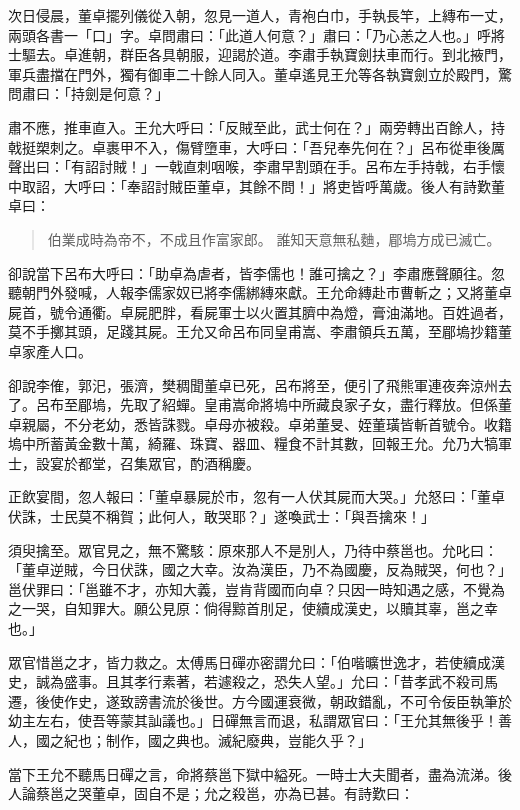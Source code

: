次日侵晨，董卓擺列儀從入朝，忽見一道人，青袍白巾，手執長竿，上縳布一丈，兩頭各書一「口」字。卓問肅曰：「此道人何意？」肅曰：「乃心恙之人也。」呼將士驅去。卓進朝，群臣各具朝服，迎謁於道。李肅手執寶劍扶車而行。到北掖門，軍兵盡擋在門外，獨有御車二十餘人同入。董卓遙見王允等各執寶劍立於殿門，驚問肅曰：「持劍是何意？」

肅不應，推車直入。王允大呼曰：「反賊至此，武士何在？」兩旁轉出百餘人，持戟挺槊刺之。卓裹甲不入，傷臂墮車，大呼曰：「吾兒奉先何在？」呂布從車後厲聲出曰：「有詔討賊！」一戟直刺咽喉，李肅早割頭在手。呂布左手持戟，右手懷中取詔，大呼曰：「奉詔討賊臣董卓，其餘不問！」將吏皆呼萬歲。後人有詩歎董卓曰：

\begin{quote}
伯業成時為帝不，不成且作富家郎。
誰知天意無私麯，郿塢方成已滅亡。
\end{quote}

卻說當下呂布大呼曰：「助卓為虐者，皆李儒也！誰可擒之？」李肅應聲願往。忽聽朝門外發喊，人報李儒家奴已將李儒綁縳來獻。王允命縳赴市曹斬之；又將董卓屍首，號令通衢。卓屍肥胖，看屍軍士以火置其臍中為燈，膏油滿地。百姓過者，莫不手擲其頭，足踐其屍。王允又命呂布同皇甫嵩、李肅領兵五萬，至郿塢抄籍董卓家產人口。

卻說李傕，郭汜，張濟，樊稠聞董卓已死，呂布將至，便引了飛熊軍連夜奔涼州去了。呂布至郿塢，先取了紹蟬。皇甫嵩命將塢中所藏良家子女，盡行釋放。但係董卓親屬，不分老幼，悉皆誅戮。卓母亦被殺。卓弟董旻、姪董璜皆斬首號令。收籍塢中所蓄黃金數十萬，綺羅、珠寶、器皿、糧食不計其數，回報王允。允乃大犒軍士，設宴於都堂，召集眾官，酌酒稱慶。

正飲宴間，忽人報曰：「董卓暴屍於市，忽有一人伏其屍而大哭。」允怒曰：「董卓伏誅，士民莫不稱賀；此何人，敢哭耶？」遂喚武士：「與吾擒來！」

須臾擒至。眾官見之，無不驚駭：原來那人不是別人，乃待中蔡邕也。允叱曰：「董卓逆賊，今日伏誅，國之大幸。汝為漢臣，乃不為國慶，反為賊哭，何也？」邕伏罪曰：「邕雖不才，亦知大義，豈肯背國而向卓？只因一時知遇之感，不覺為之一哭，自知罪大。願公見原：倘得黥首刖足，使續成漢史，以贖其辜，邕之幸也。」

眾官惜邕之才，皆力救之。太傅馬日磾亦密謂允曰：「伯喈曠世逸才，若使續成漢史，誠為盛事。且其孝行素著，若遽殺之，恐失人望。」允曰：「昔孝武不殺司馬遷，後使作史，遂致謗書流於後世。方今國運衰微，朝政錯亂，不可令佞臣執筆於幼主左右，使吾等蒙其訕議也。」日磾無言而退，私謂眾官曰：「王允其無後乎！善人，國之紀也；制作，國之典也。滅紀廢典，豈能久乎？」

當下王允不聽馬日磾之言，命將蔡邕下獄中縊死。一時士大夫聞者，盡為流涕。後人論蔡邕之哭董卓，固自不是；允之殺邕，亦為已甚。有詩歎曰：

